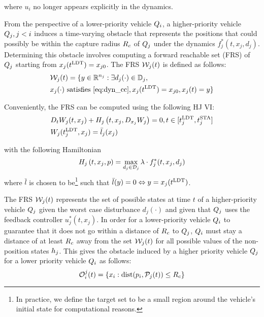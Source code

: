 \noindent where $u_i$ no longer appears explicitly in the dynamics.

From the perspective of a lower-priority vehicle $Q_i$, a higher-priority vehicle $Q_j, j < i$ induces a time-varying obstacle that represents the positions that could possibly be within the capture radius $R_c$ of $Q_j$ under the dynamics $f^*_j(t, x_j, d_j)$. Determining this obstacle involves computing a forward reachable set (FRS) of $Q_j$ starting from $x_j(t^\text{LDT}) = x_{j0}$. The FRS $\mathcal{W}_j(t)$ is defined as follows:
\vspace{-0.3em}
\begin{equation}
\label{eq:FRS1}
\begin{aligned}
&\mathcal{W}_j(t) = \{y \in \mathbb{R}^{n_j}: \exists d_j(\cdot) \in \mathbb{D}_j, \\
&x_j(\cdot) \text{ satisfies \eqref{eq:dyn_cc}}, x_j(t^\text{LDT}) = x_{j0}, x_j(t) = y\}
\end{aligned}
\end{equation}

Conveniently, the FRS can be computed using the following HJ VI:
\vspace{-0.4em}
\begin{equation}
\label{eq:FRS_HJIVI}
\begin{aligned}
&D_t W_j(t, x_j) + H_j\left(t, x_j, D_{x_j} W_j\right) = 0, t \in [t^\text{LDT}_j, t^\text{STA}_j]\\
&W_j(t^\text{LDT}_j, x_j) = \bar l_j(x_j) \\
\end{aligned}
\end{equation}

\noindent with the following Hamiltonian
\begin{equation}
H_j\left(t, x_j, p\right) = \max_{d_j \in \mathcal{D}_j} \lambda \cdot f^*_j(t, x_j, d_j)
\end{equation}
\noindent where $\bar l$ is chosen to be\footnote{In practice, we define the target set to be a small region around the vehicle's initial state for computational reasons.} such that $\bar l (y) = 0 \Leftrightarrow y = x_j(t^\text{LDT})$.

The FRS $\mathcal{W}_j(t)$ represents the set of possible states at time $t$ of a higher-priority vehicle $Q_j$ given the worst case disturbance $d_j(\cdot)$ and given that $Q_j$ uses the feedback controller $u_j^*(t, x_j)$. In order for a lower-priority vehicle $Q_i$ to guarantee that it does not go within a distance of $R_c$ to $Q_j$, $Q_i$ must stay a distance of at least $R_c$ away from the set $\mathcal{W}_j(t)$ for all possible values of the non-position states $h_j$. This gives the obstacle induced by a higher priority vehicle $Q_j$ for a lower priority vehicle $Q_i$ as follows:
\vspace{-0.4em}
\begin{equation}
\mathcal{O}_i^j(t) = \{x_i: \text{dist}(p_i, \mathcal{P}_j(t)) \le R_c \}
\end{equation}

